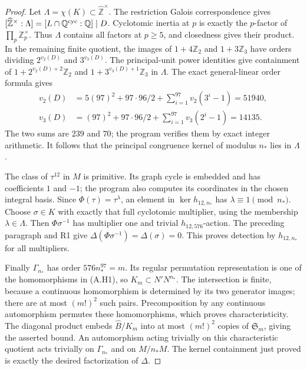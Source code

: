 \begin{proof}
Let $\Lambda=\chi(K)\subset\widehat{\mathbb Z}^{\times}$.
The restriction Galois correspondence gives
$[\widehat{\mathbb Z}^{\times}:\Lambda]
 =[L\cap\mathbb Q^{\rm cyc}:\mathbb Q]\mid D$.
Cyclotomic inertia at $p$ is exactly the $p$-factor of
$\prod_p\mathbb Z_p^\times$. Thus $\Lambda$ contains all
factors at $p\ge5$, and closedness gives their product.
In the remaining finite quotient, the images of
$1+4\mathbb Z_2$ and $1+3\mathbb Z_3$ have orders dividing
$2^{v_2(D)}$ and $3^{v_3(D)}$. The principal-unit power
identities give containment of
$1+2^{v_2(D)+2}\mathbb Z_2$ and
$1+3^{v_3(D)+1}\mathbb Z_3$ in $\Lambda$.
The exact general-linear order formula gives
\[
 \begin{split}
 v_2(D)&=5(97)^2+97\cdot96/2+
           \sum_{i=1}^{97}v_2(3^i-1)=51940,\\
 v_3(D)&=(97)^2+97\cdot96/2+
           \sum_{i=1}^{97}v_3(2^i-1)=14135.
 \end{split}                                             \tag{A.H5}
\]
The two sums are $239$ and $70$; the program verifies them
by exact integer arithmetic. It follows that the principal
congruence kernel of modulus $n_*$ lies in $\Lambda$.

The class of $\tau^{12}$ in $M$ is primitive. Its graph
cycle is embedded and has coefficients $1$ and $-1$; the
program also computes its coordinates in the chosen integral
basis. Since $\Phi(\tau)=\tau^\lambda$, an element in
$\ker h_{12,n_*}$ has $\lambda\equiv1\pmod{n_*}$.
Choose $\sigma\in K$ with exactly that full cyclotomic
multiplier, using the membership $\lambda\in\Lambda$.
Then $\Phi\sigma^{-1}$ has multiplier one and trivial
$h_{12,576}$-action. The preceding paragraph and R1 give
$\Delta(\Phi\sigma^{-1})=\Delta(\sigma)=0$.
This proves detection by $h_{12,n_*}$ for all multipliers.

Finally $\Gamma_{n_*}$ has order $576n_*^{97}=m$.
Its regular permutation representation is one of the
homomorphisms in (A.H1), so
$K_m\subset N'N^{n_*}$. The intersection is finite, because
a continuous homomorphism is determined by its two generator
images; there are at most $(m!)^2$ such pairs. Precomposition
by any continuous automorphism permutes these homomorphisms,
which proves characteristicity. The diagonal product embeds
$\widehat B/K_m$ into at most $(m!)^2$ copies of
$\mathfrak S_m$, giving the asserted bound.
An automorphism acting trivially on this characteristic
quotient acts trivially on $\Gamma_{n_*}$ and on $M/n_*M$.
The kernel containment just proved is exactly the desired
factorization of $\Delta$.
\end{proof}
